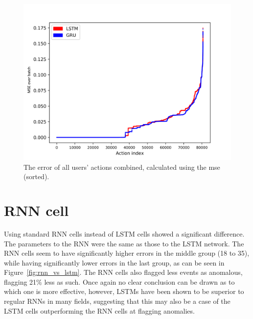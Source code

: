 \begin{figure}
	\begin{center}
		\includegraphics[scale=6.0]{experiments/cell/losses/comparison}
	\end{center}
	\caption{The error of all users' actions combined, calculated using the mse (sorted).~\label{fig:gru_rnn_losses}}
\end{figure}

\section{RNN cell}
Using standard RNN cells instead of LSTM cells showed a significant difference. The parameters to the RNN were the same as those to the LSTM network. The RNN cells seem to have significantly higher errors in the middle group (18 to 35), while having significantly lower errors in the last group, as can be seen in Figure~\ref{fig:rnn_vs_lstm}. The RNN cells also flagged less events as anomalous, flagging 21\% less as such. Once again no clear conclusion can be drawn as to which one is more effective, however, LSTMs have been shown to be superior to regular RNNs in many fields, suggesting that this may also be a case of the LSTM cells outperforming the RNN cells at flagging anomalies.

